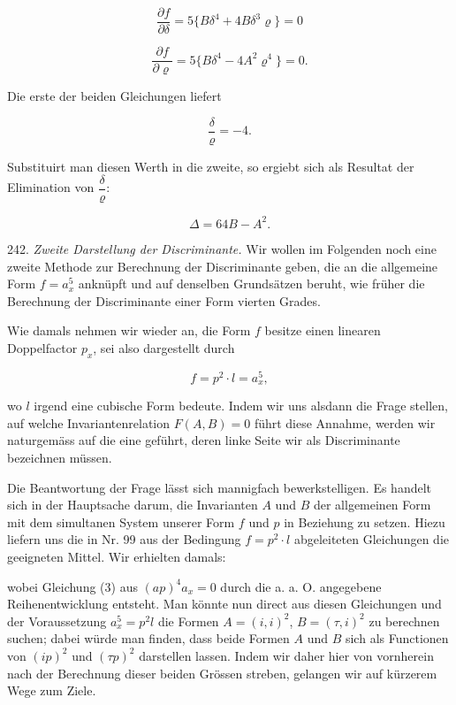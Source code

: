 \[ \frac{\partial f}{\partial\delta} = 5\{B\delta^4+4B\delta^3\varrho\}=0 \]

\[ \frac{\partial f}{\partial\varrho} = 5\{B\delta^4-4A^2\varrho^4\}=0. \]

Die erste der beiden Gleichungen liefert

\[ \frac{\delta}{\varrho} = -4. \]

Substituirt man diesen Werth in die zweite, so ergiebt sich als
Resultat der Elimination von $\dfrac{\delta}{\varrho}$:

\[ \Delta = 64B-A^2. \]

242. \textit{Zweite Darstellung der Discriminante.} Wir wollen im Folgenden
 noch eine zweite Methode zur Berechnung der Discriminante geben,
die an die allgemeine Form $f=a_x^5$ anknüpft und auf denselben Grundsätzen
 beruht, wie früher die Berechnung der Discriminante einer
Form vierten Grades.

Wie damals nehmen wir wieder an, die Form $f$ besitze einen
linearen Doppelfactor $p_x$, sei also dargestellt durch

\[ f = p^2\cdot l = a_x^5, \]

wo $l$ irgend eine cubische Form bedeute. Indem wir uns alsdann die
Frage stellen, auf welche Invariantenrelation $F(A,B)=0$ führt diese
Annahme, werden wir naturgemäss auf die eine geführt, deren linke
Seite wir als Discriminante bezeichnen müssen.

Die Beantwortung der Frage lässt sich mannigfach bewerkstelligen.
Es handelt sich in der Hauptsache darum, die Invarianten $A$ und $B$
der allgemeinen Form mit dem simultanen System unserer Form $f$
und $p$ in Beziehung zu setzen. Hiezu liefern uns die in Nr. 99 aus
der Bedingung $f=p^2\cdot l$ abgeleiteten Gleichungen die geeigneten
Mittel. Wir erhielten damals:





wobei Gleichung (3) aus $(ap)^4a_x=0$ durch die a. a. O. angegebene
Reihenentwicklung entsteht. Man könnte nun direct aus diesen
Gleichungen und der Voraussetzung $a_x^5=p^2l$ die Formen $A=(i,i)^2$,
$B=(\tau,i)^2$ zu berechnen suchen; dabei würde man finden, dass beide
Formen $A$ und $B$ sich als Functionen von $(ip)^2$ und $(\tau p)^2$ darstellen
lassen. Indem wir daher hier von vornherein nach der Berechnung
dieser beiden Grössen streben, gelangen wir auf kürzerem Wege
zum Ziele.

